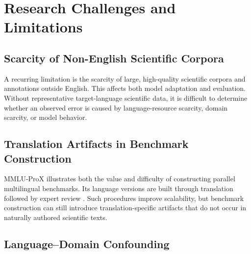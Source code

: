 \documentclass[acmsmall,screen,review]{acmart}
\begin{document}

\section{Research Challenges and Limitations}
\label{sec:challenges}


\subsection{Scarcity of Non-English Scientific Corpora}
\label{sec:corpora}

A recurring limitation is the scarcity of large, high-quality scientific corpora and annotations outside English. This affects both model adaptation and evaluation. Without representative target-language scientific data, it is difficult to determine whether an observed error is caused by language-resource scarcity, domain scarcity, or model behavior.


\subsection{Translation Artifacts in Benchmark Construction}
\label{sec:translation}

MMLU-ProX illustrates both the value and difficulty of constructing parallel multilingual benchmarks. Its language versions are built through translation followed by expert review \citep{xuan2025mmlupro}. Such procedures improve scalability, but benchmark construction can still introduce translation-specific artifacts that do not occur in naturally authored scientific texts.


\subsection{Language--Domain Confounding}
\label{sec:confounding}
\end{document}
